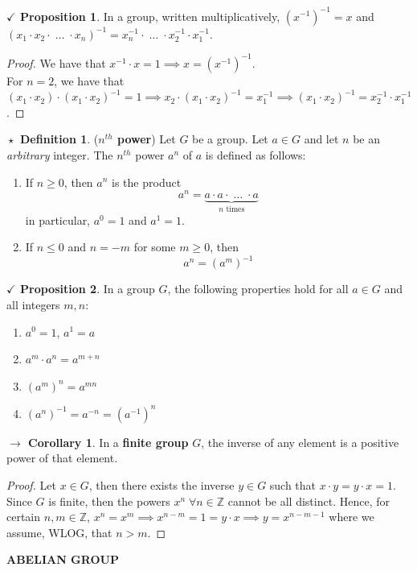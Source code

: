 \documentclass{article}
\theoremstyle{definition}
\newtheorem{definition}{$\boxed{\star}$ Definition}
\theoremstyle{remark}
\theoremstyle{definition}
\newtheorem{corollary}{$ \to $ Corollary}
\theoremstyle{definition}
\newtheorem{proposition}{$\checkmark$ Proposition}
\theoremstyle{definition}
\theoremstyle{proof}
\newcommand{\inv}[1]{#1^{-1}}
\begin{document}
\hrulefill
\begin{proposition}
	In a group, written multiplicatively, $ \inv{(\inv{x})} = x$ and $ \inv{(x_1\cdot x_2\cdot \;\dots\;\cdot x_n)} = \inv{x_n}\cdot\; \dots \;\cdot \inv{x_2} \cdot \inv{x_1} $.
\end{proposition}
\begin{proof}
	We have that $ \inv{x} \cdot x = 1 \implies x = \inv{(\inv{x})}$.\\
	For $ n=2 $, we have that $ (x_1\cdot x_2)\cdot\inv{(x_1\cdot x_2)} = 1 \implies x_2 \cdot \inv{(x_1\cdot x_2)} = \inv{x_1} \implies \inv{(x_1 \cdot x_2)} = \inv{x_2}\cdot \inv{x_1}$.
\end{proof}
\hrulefill
\begin{definition}
	(\textbf{$ n^{th} $ power}) Let $ G $ be a group. Let $ a \in G $ and let $ n $ be an \emph{arbitrary} integer. The $ n^{th} $ power $ a^n $ of $ a $ is defined as follows:
	\begin{enumerate}
		\item{If $ n \ge 0 $, then $ a^n $ is the product 
	\[a^n = \underbrace{a\cdot a\cdot \;\dots \;\cdot a}_{n \text{ times}}\]
	in particular, $ a^0 = 1 $ and $ a^1 = 1 $. 	
	}
\item{If $ n\le  0 $ and $ n = -m $ for some $ m\ge 0 $, then
\[a^n = \inv{(a^m)}\]
}
	\end{enumerate}
\end{definition}
\hrulefill
\begin{proposition}
	In a group $ G $, the following properties hold for all $ a\in G $ and all integers $ m,n $:
	\begin{enumerate}
		\item{$ a^0 = 1 $, $ a^1 = a $}
		\item{$ a^m \cdot a^n = a^{m+n} $}
		\item{$ (a^m)^n = a^{mn} $}
		\item{$\inv{(a^n)} = a^{-n} = (\inv{a})^n$}
	\end{enumerate}
\end{proposition}
\begin{corollary}
	In a \textbf{finite group} $ G $, the inverse of any element is a positive power of that element.
\end{corollary}
\begin{proof}
	Let $ x \in G $, then there exists the inverse $ y \in G $ such that $ x\cdot y = y\cdot x = 1$. Since $ G $ is finite, then the powers $ x^n \;\forall n\in \mathbb{Z}$ cannot be all distinct. Hence, for certain $ n,m \in \mathbb{Z} $, $ x^n = x^m \implies x^{n-m} = 1 = y\cdot x\implies y = x^{n-m-1}$ where we assume, WLOG, that $ n>m $.
\end{proof}
\newpage
\hrulefill
\textbf{ABELIAN GROUP}
\hrulefill
\end{document}

